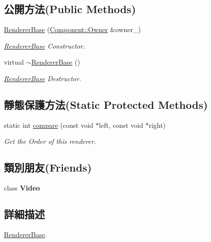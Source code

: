 \subsection*{公開方法(Public Methods)}
\begin{DoxyCompactItemize}
\item 
\hyperlink{class_magnum_1_1_renderer_base_aa3b9e785717f998801d7ca13cc9d23be}{Renderer\+Base} (\hyperlink{class_magnum_1_1_component_1_1_owner}{Component\+::\+Owner} \&owner\+\_\+)
\begin{DoxyCompactList}\small\item\em \hyperlink{class_magnum_1_1_renderer_base}{Renderer\+Base} Constructor. \end{DoxyCompactList}\item 
virtual \hyperlink{class_magnum_1_1_renderer_base_a5225d642bfea54badfaa3f7a503a2de1}{$\sim$\+Renderer\+Base} ()
\begin{DoxyCompactList}\small\item\em \hyperlink{class_magnum_1_1_renderer_base}{Renderer\+Base} Destructor. \end{DoxyCompactList}\end{DoxyCompactItemize}
\subsection*{靜態保護方法(Static Protected Methods)}
\begin{DoxyCompactItemize}
\item 
static int \hyperlink{class_magnum_1_1_renderer_base_ac3c20e039f761bf43637d6474bde3e87}{compare} (const void $\ast$left, const void $\ast$right)
\begin{DoxyCompactList}\small\item\em Get the Order of this renderer. \end{DoxyCompactList}\end{DoxyCompactItemize}
\subsection*{類別朋友(Friends)}
\begin{DoxyCompactItemize}
\item 
class {\bfseries Video}\hypertarget{class_magnum_1_1_renderer_base_a525039adce643855a9564c856c2cf3d1}{}\label{class_magnum_1_1_renderer_base_a525039adce643855a9564c856c2cf3d1}

\end{DoxyCompactItemize}


\subsection{詳細描述}
\hyperlink{class_magnum_1_1_renderer_base}{Renderer\+Base}. 

